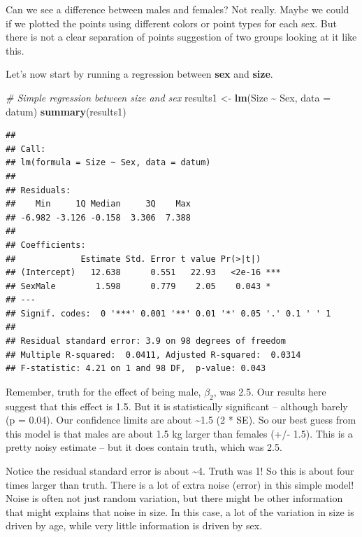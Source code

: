 \documentclass[
]{article}
\newenvironment{Shaded}{\begin{snugshade}}{\end{snugshade}}
\newcommand{\AttributeTok}[1]{\textcolor[rgb]{0.13,0.29,0.53}{#1}}
\newcommand{\CommentTok}[1]{\textcolor[rgb]{0.56,0.35,0.01}{\textit{#1}}}
\newcommand{\FunctionTok}[1]{\textcolor[rgb]{0.13,0.29,0.53}{\textbf{#1}}}
\newcommand{\NormalTok}[1]{#1}
\newcommand{\OtherTok}[1]{\textcolor[rgb]{0.56,0.35,0.01}{#1}}
\newcommand{\SpecialCharTok}[1]{\textcolor[rgb]{0.81,0.36,0.00}{\textbf{#1}}}
\begin{document}
Can we see a difference between males and females? Not really. Maybe we
could if we plotted the points using different colors or point types for
each sex. But there is not a clear separation of points suggestion of
two groups looking at it like this.

Let's now start by running a regression between \textbf{sex} and
\textbf{size}.

\begin{Shaded}
\begin{Highlighting}[]
\CommentTok{\# Simple regression between size and sex }
\NormalTok{results1 }\OtherTok{\textless{}{-}} \FunctionTok{lm}\NormalTok{(Size }\SpecialCharTok{\textasciitilde{}}\NormalTok{ Sex, }\AttributeTok{data =}\NormalTok{ datum)}
\FunctionTok{summary}\NormalTok{(results1)}
\end{Highlighting}
\end{Shaded}

\begin{verbatim}
## 
## Call:
## lm(formula = Size ~ Sex, data = datum)
## 
## Residuals:
##    Min     1Q Median     3Q    Max 
## -6.982 -3.126 -0.158  3.306  7.388 
## 
## Coefficients:
##             Estimate Std. Error t value Pr(>|t|)    
## (Intercept)   12.638      0.551   22.93   <2e-16 ***
## SexMale        1.598      0.779    2.05    0.043 *  
## ---
## Signif. codes:  0 '***' 0.001 '**' 0.01 '*' 0.05 '.' 0.1 ' ' 1
## 
## Residual standard error: 3.9 on 98 degrees of freedom
## Multiple R-squared:  0.0411, Adjusted R-squared:  0.0314 
## F-statistic: 4.21 on 1 and 98 DF,  p-value: 0.043
\end{verbatim}

Remember, truth for the effect of being male, \(\beta_2\), was 2.5. Our
results here suggest that this effect is 1.5. But it is statistically
significant -- although barely (p = 0.04). Our confidence limits are
about \textasciitilde1.5 (2 * SE). So our best guess from this model is
that males are about 1.5 kg larger than females (+/- 1.5). This is a
pretty noisy estimate -- but it does contain truth, which was 2.5.

Notice the residual standard error is about \textasciitilde4. Truth was
1! So this is about four times larger than truth. There is a lot of
extra noise (error) in this simple model! Noise is often not just random
variation, but there might be other information that might explains that
noise in size. In this case, a lot of the variation in size is driven by
age, while very little information is driven by sex.
\end{document}
